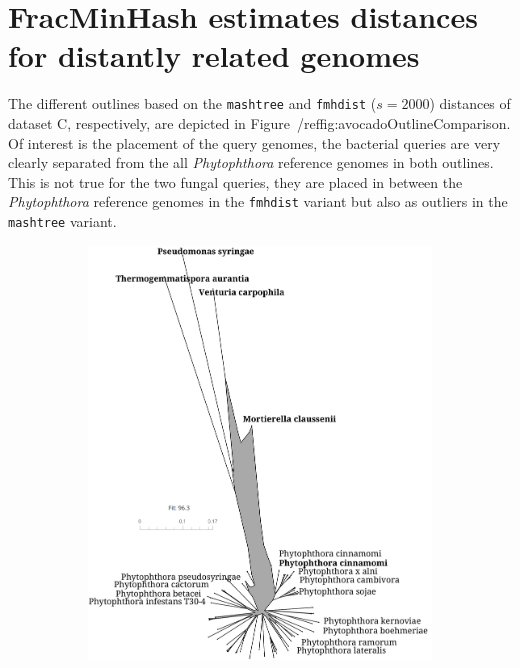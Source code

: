 \section{FracMinHash estimates distances for distantly related genomes}
The different outlines based on the \texttt{mashtree} and \texttt{fmhdist}
($s=2000$) distances of dataset C, respectively, are depicted in
Figure~/ref{fig:avocadoOutlineComparison}. Of interest is the placement of the
query genomes, the bacterial queries are very clearly separated from the all
\textit{Phytophthora} reference genomes in both outlines. This is not true for
the two fungal queries, they are placed in between the \textit{Phytophthora}
reference genomes in the \texttt{fmhdist} variant but also as outliers in the
\texttt{mashtree} variant.

\begin{figure}
  \centering
  \begin{subfigure}{0.49\textwidth}
    \includegraphics[width=1.0\textwidth]{figures/mashtree_avocado4-1_k21_s2000.png}
  \end{subfigure}
  \begin{subfigure}{0.49\textwidth}

\end{subfigure}
\end{figure}
